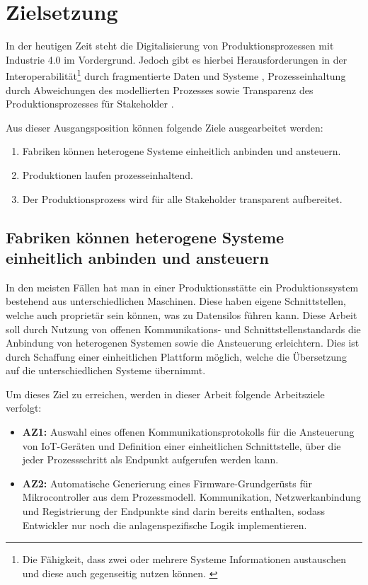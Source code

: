 \section{Zielsetzung}

In der heutigen Zeit steht die Digitalisierung von Produktionsprozessen mit Industrie 4.0 im Vordergrund. Jedoch gibt es hierbei Herausforderungen in der Interoperabilität\footnote{Die Fähigkeit, dass zwei oder mehrere Systeme Informationen austauschen und diese auch gegenseitig nutzen können. \cite{interoperability_iso}} durch fragmentierte Daten und Systeme \cite{huebner_semantic_2026}, Prozesseinhaltung durch Abweichungen des modellierten Prozesses \cite{van_der_aalst_replaying_2012} sowie Transparenz des Produktionsprozesses für Stakeholder \cite{jawad_adoption_2022}.

\newpage

\noindent Aus dieser Ausgangsposition können folgende Ziele ausgearbeitet werden:

\begin{enumerate}
    \item Fabriken können heterogene Systeme einheitlich anbinden und ansteuern.
    \item Produktionen laufen prozesseinhaltend.
    \item Der Produktionsprozess wird für alle Stakeholder transparent aufbereitet.
\end{enumerate}

\subsection{Fabriken können heterogene Systeme einheitlich anbinden und ansteuern}

In den meisten Fällen hat man in einer Produktionsstätte ein Produktionssystem bestehend aus unterschiedlichen Maschinen. 
Diese haben eigene Schnittstellen, welche auch proprietär sein können, was zu Datensilos führen kann. Diese Arbeit soll durch Nutzung von 
offenen Kommunikations- und Schnittstellenstandards die Anbindung von heterogenen Systemen sowie die Ansteuerung erleichtern. Dies ist durch Schaffung einer einheitlichen Plattform möglich, 
welche die Übersetzung auf die unterschiedlichen Systeme übernimmt.

\noindent Um dieses Ziel zu erreichen, werden in dieser Arbeit folgende Arbeitsziele verfolgt:

\begin{itemize}
  \item \textbf{AZ1:} Auswahl eines offenen Kommunikationsprotokolls für die Ansteuerung von 
  IoT-Geräten und Definition einer einheitlichen Schnittstelle, über die jeder Prozessschritt als Endpunkt aufgerufen werden kann.

  \item \textbf{AZ2:} Automatische Generierung eines Firmware-Grundgerüsts für 
  Mikrocontroller aus dem Prozessmodell. Kommunikation, Netzwerkanbindung und Registrierung 
  der Endpunkte sind darin bereits enthalten, sodass Entwickler nur noch die 
  anlagenspezifische Logik implementieren.
\end{itemize}

